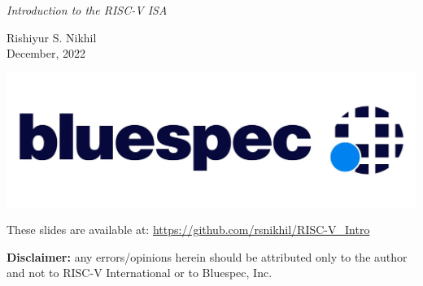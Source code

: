 \documentclass{article}
\begin{document}

\vspace*{1in}

\begin{center}\Huge
  \emph{Introduction to the RISC-V ISA}

  \vspace*{0.5in}

  Rishiyur S. Nikhil \\
  December, 2022

  \vspace*{1in}

  \includegraphics{Figs/Bluespec_Logo_2022-10.jpg}

  \vfill

  \begin{minipage}{7in}\Large
    These slides are available at: \url{https://github.com/rsnikhil/RISC-V_Intro}

    \vspace{1ex}

    {\bf Disclaimer:} any errors/opinions herein should be attributed
    only to the author and not to RISC-V International or to
    Bluespec, Inc.
  \end{minipage}

\end{center}

\clearpage

\end{document}
